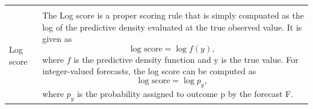 \documentclass[
]{jss}
\begin{document}
\begin{CodeChunk}
\begin{longtable}[t]{>{\raggedright\arraybackslash}p{1.1in}>{\raggedright\arraybackslash}p{4.625in}}
\cellcolor{gray!6}{  **Usage and caveats** Smaller values are better. The crps is a good choice for most practical purposes that involve decision making, as it takes the entire predictive distribution into account. If two forecasters assign the same probability to the true event $y$, then the forecaster who assigned high probability to events far away from $y$ will still get a worse score. The crps (in contrast to the log score) can at times be quite lenient towards extreme mispredictions. Also, due to it's similarity to the absolute error, the level of scores depend a lot on the absolute value of what is predicted, which makes it hard to compare scores of forecasts for quantities that are orders of magnitude apart.}\\
\addlinespace
Log score & The Log score is a proper scoring rule that is simply compuated as the log of the predictive density evaluated at the true observed value. It is given as
  $$ \text{log score} = \log f(y), $$
  where $f$ is the predictive density function and y is the true value. For integer-valued forecasts, the log score can be computed as
  $$ \text{log score} = \log p_y, $$
  where $p_y$ is the probability assigned to outcome p by the forecast F.


\end{longtable}
\end{CodeChunk}
\end{document}
